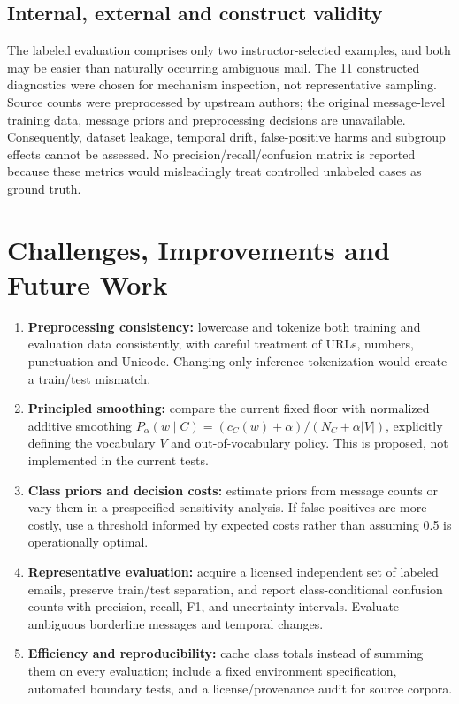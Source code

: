 \documentclass[11pt,letterpaper]{article}
\begin{document}
\subsection{Internal, external and construct validity}
The labeled evaluation comprises only two instructor-selected examples, and both may be easier than naturally occurring ambiguous mail. The 11 constructed diagnostics were chosen for mechanism inspection, not representative sampling. Source counts were preprocessed by upstream authors; the original message-level training data, message priors and preprocessing decisions are unavailable. Consequently, dataset leakage, temporal drift, false-positive harms and subgroup effects cannot be assessed. No precision/recall/confusion matrix is reported because these metrics would misleadingly treat controlled unlabeled cases as ground truth.

\section{Challenges, Improvements and Future Work}
\begin{enumerate}[leftmargin=*]
\item \textbf{Preprocessing consistency:} lowercase and tokenize both training and evaluation data consistently, with careful treatment of URLs, numbers, punctuation and Unicode. Changing only inference tokenization would create a train/test mismatch.
\item \textbf{Principled smoothing:} compare the current fixed floor with normalized additive smoothing $P_\alpha(w\mid C)=(c_C(w)+\alpha)/(N_C+\alpha |V|)$, explicitly defining the vocabulary $V$ and out-of-vocabulary policy. This is proposed, not implemented in the current tests.
\item \textbf{Class priors and decision costs:} estimate priors from message counts or vary them in a prespecified sensitivity analysis. If false positives are more costly, use a threshold informed by expected costs rather than assuming 0.5 is operationally optimal.
\item \textbf{Representative evaluation:} acquire a licensed independent set of labeled emails, preserve train/test separation, and report class-conditional confusion counts with precision, recall, F1, and uncertainty intervals. Evaluate ambiguous borderline messages and temporal changes.
\item \textbf{Efficiency and reproducibility:} cache class totals instead of summing them on every evaluation; include a fixed environment specification, automated boundary tests, and a license/provenance audit for source corpora.
\end{enumerate}
\end{document}
